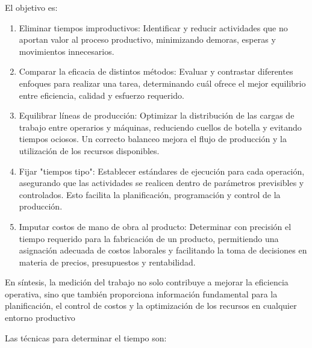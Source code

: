 \documentclass[a4paper,oneside,11pt]{article}
\begin{document}
El objetivo es: 
\begin{enumerate}
    \item Eliminar tiempos improductivos: Identificar y reducir actividades que no aportan valor al proceso productivo, minimizando demoras, esperas y movimientos innecesarios.
    \item Comparar la eficacia de distintos métodos: Evaluar y contrastar diferentes enfoques para realizar una tarea, determinando cuál ofrece el mejor equilibrio entre eficiencia, calidad y esfuerzo requerido.
    \item Equilibrar líneas de producción: Optimizar la distribución de las cargas de trabajo entre operarios y máquinas, reduciendo cuellos de botella y evitando tiempos ociosos. Un correcto balanceo mejora el flujo de producción y la utilización de los recursos disponibles.
    \item Fijar "tiempos tipo": Establecer estándares de ejecución para cada operación, asegurando que las actividades se realicen dentro de parámetros previsibles y controlados. Esto facilita la planificación, programación y control de la producción.
    \item Imputar costos de mano de obra al producto: Determinar con precisión el tiempo requerido para la fabricación de un producto, permitiendo una asignación adecuada de costos laborales y facilitando la toma de decisiones en materia de precios, presupuestos y rentabilidad.
\end{enumerate}

En síntesis, la medición del trabajo no solo contribuye a mejorar la eficiencia operativa, sino que también proporciona información fundamental para la planificación, el control de costos y la optimización de los recursos en cualquier entorno productivo

Las técnicas para determinar el tiempo son: 
\end{document}
